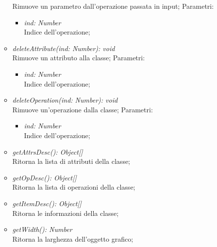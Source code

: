\documentclass[../DefinizioneDiProdotto.tex]{subfiles}
\begin{document}
\begin{itemize}
\begin{itemize}
					Rimuove un parametro dall'operazione passata in input;
					Parametri:
					\begin{itemize}
						\item \emph{ind: Number} \\
						Indice dell'operazione;
					\end{itemize}
					\item \emph{deleteAttribute(ind: Number): void}\\
					Rimuove un attributo alla classe;
					Parametri:
					\begin{itemize}
						\item \emph{ind: Number} \\
						Indice dell'operazione;
					\end{itemize}
					\item \emph{deleteOperation(ind: Number): void}\\
					Rimuove un'operazione dalla classe;
					Parametri:
					\begin{itemize}
						\item \emph{ind: Number} \\
						Indice dell'operazione;
					\end{itemize}
					\item \emph{getAttrsDesc(): Object[]}\\
					Ritorna la lista di attributi della classe;
					\item \emph{getOpDesc(): Object[]}\\
					Ritorna la lista di operazioni della classe;
					\item \emph{getItemDesc(): Object[]}\\
					Ritorna le informazioni della classe;		
					\item \emph{getWidth(): Number}\\
					Ritorna la larghezza dell'oggetto grafico;	
				\end{itemize}
			\end{itemize}
			
\end{document}
